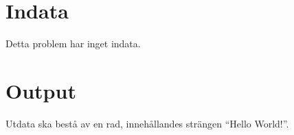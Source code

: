 
\section*{Indata}

Detta problem har inget indata.

\section*{Output}

Utdata ska bestå av en rad, innehållandes strängen ``Hello World!''.
